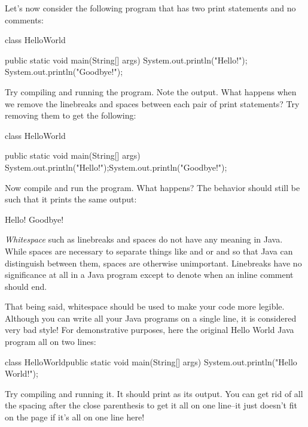 Let's now consider the following program that has two print statements and no comments:
\begin{code}
class HelloWorld {

    public static void main(String[] args) {
        System.out.println("Hello!");
        System.out.println("Goodbye!");
    }

}
\end{code}
Try compiling and running the program. Note the output.
What happens when we remove the linebreaks and spaces between each pair of print statements?
Try removing them to get the following:
\begin{code}
class HelloWorld {

    public static void main(String[] args) {
        System.out.println("Hello!");System.out.println("Goodbye!");
    }

}
\end{code}
Now compile and run the program. What happens?
The behavior should still be such that it prints the same output:
\begin{code}
Hello!
Goodbye!
\end{code}
\emph{Whitespace} such as linebreaks and spaces do not have any meaning in Java.
While spaces are necessary to separate things like  and  or  and 
so that Java can distinguish between them, spaces are otherwise unimportant.
Linebreaks have no significance at all in a Java program except to denote when an inline comment
should end.

That being said, whitespace should be used to make your code more legible. Although you can write
all your Java programs on a single line, it is considered very bad style!
For demonstrative purposes, here the original Hello World Java program all on two lines:
\begin{code}
class HelloWorld{public static void main(String[] args)
    {System.out.println("Hello World!");}}
\end{code}
Try compiling and running it. It should print  as its output.
You can get rid of all the spacing after the close parenthesis \ic{)} to get it all on one line--it
just doesn't fit on the page if it's all on one line here!
